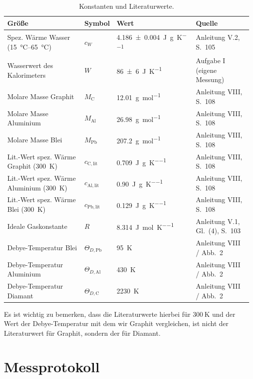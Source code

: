 \documentclass{article}
\begin{document}
\begin{table}[H]
	\centering
	\small
	\begin{tabular}{llll}
		\toprule
		Größe & Symbol & Wert & Quelle \\
		\midrule
		Spez. Wärme Wasser (\qtyrange{15}{65}{\degreeCelsius}) & $c_W$ & \qty{4.186(4)}{\joule\per\gram\per\kelvin} & Anleitung V.2, S.~105 \\
		Wasserwert des Kalorimeters & $W$ & \qty{86(6)}{\joule\per\kelvin} & Aufgabe I (eigene Messung) \\
		Molare Masse Graphit & $M_\mathrm{C}$ & \qty{12.01}{\gram\per\mol} & Anleitung VIII, S.~108 \\
		Molare Masse Aluminium & $M_\mathrm{Al}$ & \qty{26.98}{\gram\per\mol} & Anleitung VIII, S.~108 \\
		Molare Masse Blei & $M_\mathrm{Pb}$ & \qty{207.2}{\gram\per\mol} & Anleitung VIII, S.~108 \\
		Lit.-Wert spez. Wärme Graphit (\qty{300}{\kelvin}) & $c_\mathrm{C,lit}$ & \qty{0.709}{\joule\per\gram\per\kelvin} & Anleitung VIII, S.~108 \\
		Lit.-Wert spez. Wärme Aluminium (\qty{300}{\kelvin}) & $c_\mathrm{Al,lit}$ & \qty{0.90}{\joule\per\gram\per\kelvin} & Anleitung VIII, S.~108 \\
		Lit.-Wert spez. Wärme Blei (\qty{300}{\kelvin}) & $c_\mathrm{Pb,lit}$ & \qty{0.129}{\joule\per\gram\per\kelvin} & Anleitung VIII, S.~108 \\
		Ideale Gaskonstante & $R$ & \qty{8.314}{\joule\per\mol\per\kelvin} & Anleitung V.1, Gl.~(4), S.~103 \\
		Debye-Temperatur Blei & $\Theta_{D,\mathrm{Pb}}$ & \qty{95}{\kelvin} & Anleitung VIII / Abb.~2 \\
		Debye-Temperatur Aluminium & $\Theta_{D,\mathrm{Al}}$ & \qty{430}{\kelvin} & Anleitung VIII / Abb.~2 \\
		Debye-Temperatur Diamant & $\Theta_{D,\mathrm{C}}$ & \qty{2230}{\kelvin} & Anleitung VIII / Abb.~2 \\
		\bottomrule
	\end{tabular}
	\caption{Konstanten und Literaturwerte.}
	\label{tab:konstanten}
\end{table}

Es ist wichtig zu bemerken, dass die Literaturwerte hierbei für $\qty{300}{\kelvin}$ und der Wert der Debye-Temperatur mit dem wir Graphit vergleichen,
ist nicht der Literaturwert für Graphit, sondern der für Diamant.

\clearpage
\section{Messprotokoll}
\label{sec:messprotokoll}
\end{document}
